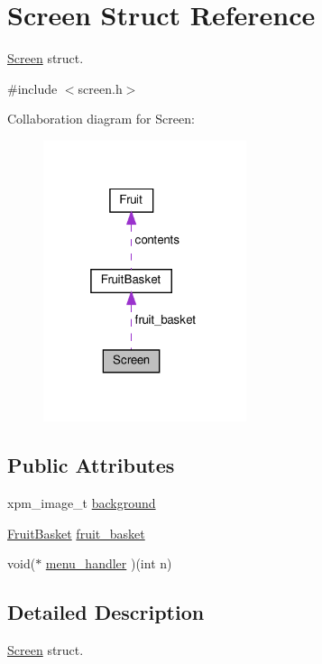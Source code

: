 \hypertarget{structScreen}{}\section{Screen Struct Reference}
\label{structScreen}


\hyperlink{structScreen}{Screen} struct.  




{\ttfamily \#include $<$screen.\+h$>$}



Collaboration diagram for Screen\+:\nopagebreak
\begin{figure}[H]
\begin{center}
\leavevmode
\includegraphics[width=169pt]{structScreen__coll__graph}
\end{center}
\end{figure}
\subsection*{Public Attributes}
\begin{DoxyCompactItemize}
\item 
xpm\+\_\+image\+\_\+t \hyperlink{structScreen_a6bc9bc49ce6a6ff009a1e36ce2e7728e}{background}
\item 
\hyperlink{structFruitBasket}{Fruit\+Basket} \hyperlink{structScreen_ae8d2ff6f05989063701c35a1c7c9af04}{fruit\+\_\+basket}
\item 
void($\ast$ \hyperlink{structScreen_af566421bd2910a893dc1692c8a9357b0}{menu\+\_\+handler} )(int n)
\end{DoxyCompactItemize}


\subsection{Detailed Description}
\hyperlink{structScreen}{Screen} struct. 

